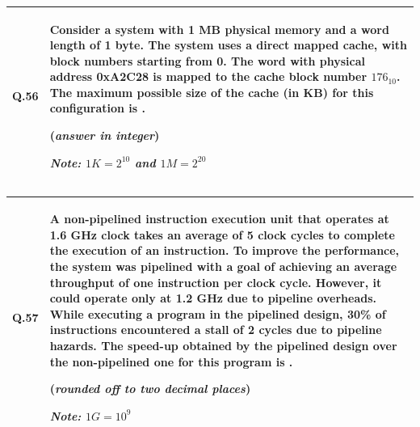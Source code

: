 \documentclass[14pt]{article}
\begin{document}
\begin{tabular}{|p{1.5cm}|p{12cm}|}
\hline

Q.56 &
\begin{minipage}[t]{12cm}


Consider a system with 1 MB physical memory and a word length
of 1 byte. The system uses a direct mapped cache, with block
numbers starting from 0. The word with physical address 0xA2C28 is
mapped to the cache block number $176_{10}$. The maximum possible
size of the cache (in KB) for this configuration is
\underline{\hspace{2cm}}.

(\textit{answer in integer})

\vspace{0.3cm}

\textit{Note: $1K=2^{10}$ and $1M=2^{20}$}

\vspace{0.5cm}
\end{minipage}
\\

\hline
\end{tabular}

\vspace{0.3cm}

\begin{tabular}{|p{1.5cm}|p{12cm}|}
\hline

Q.57 &
\begin{minipage}[t]{12cm}


A non-pipelined instruction execution unit that operates at 1.6 GHz
clock takes an average of 5 clock cycles to complete the execution
of an instruction. To improve the performance, the system was
pipelined with a goal of achieving an average throughput of one
instruction per clock cycle. However, it could operate only at
1.2 GHz due to pipeline overheads. While executing a program in the
pipelined design, 30\% of instructions encountered a stall of 2 cycles
due to pipeline hazards. The speed-up obtained by the pipelined
design over the non-pipelined one for this program is
\underline{\hspace{2cm}}.

(\textit{rounded off to two decimal places})

\vspace{0.3cm}

\textit{Note: $1G=10^{9}$}

\vspace{0.5cm}
\end{minipage}
\\

\hline
\end{tabular}
\end{document}
